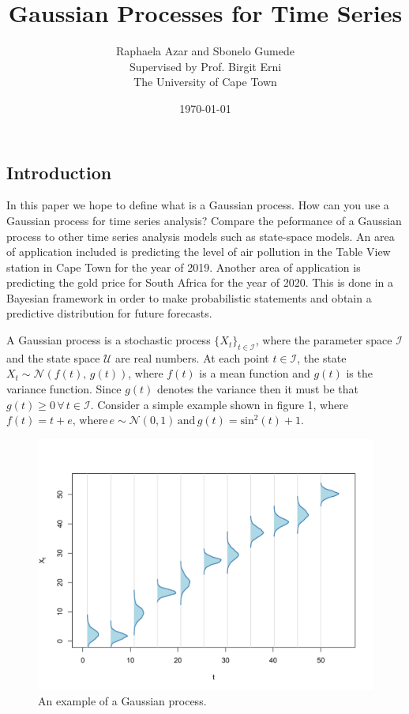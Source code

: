 \documentclass[a4paper, 10pt]{article}
\title{Gaussian Processes for Time Series}
\date{\today}
\author{Raphaela Azar and Sbonelo Gumede \\
Supervised by Prof. Birgit Erni\\
The University of Cape Town}
\begin{document}
   \maketitle

   \begin{flushleft}
   
   \section*{Introduction}

   In this paper we hope to define what is a Gaussian process. How can you use a Gaussian process for time series analysis? Compare the peformance of a Gaussian process to other time series analysis models such as state-space models. An area of application included is predicting the level of air pollution in the Table View station in Cape Town for the year of 2019. Another area of application is predicting the gold price for South Africa for the year of 2020. This is done in a Bayesian framework in order to make probabilistic statements and obtain a predictive distribution for future forecasts.

   \vspace{1em}

   A Gaussian process is a stochastic process $\{X_{t} \}_{t \in \mathcal{I}}$, where the parameter space $\mathcal{I}$ and the state space $\mathcal{U}$ are real numbers. At each point $t \in \mathcal{I}$, the state $X_{t} \sim \mathcal{N}(f(t), \, g(t))$, where $f(t)$ is a mean function and $g(t)$ is the variance function. Since $g(t)$ denotes the variance then it must be that $g(t) \geq 0 \, \forall \, t \in \mathcal{I}$. Consider a simple example shown in figure 1, where $f(t) = t + e, \, \text{where} \, e \sim \mathcal{N}(0, 1) \, \text{and} \, g(t) = \text{sin}^{2}(t) + 1$.
   
   \begin{figure}[H]
            \raggedright
            \includegraphics[width=0.48\linewidth]{../images/gp.png}
            \caption{An example of a Gaussian process.}
   \end{figure}
   

\end{flushleft}
\end{document}
